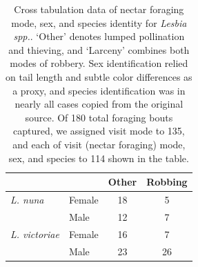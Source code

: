 \documentclass[fleqn,10pt,lineno]{wlpeerj}
\begin{document}
\begin{table}[ht]
\caption{\label{tab:widgets} Cross tabulation data of nectar foraging mode, sex, and species identity for \textit{Lesbia spp.}. `Other' denotes lumped pollination and thieving, and `Larceny' combines both modes of robbery. Sex identification relied on tail length and subtle color differences as a proxy, and species identification was in nearly all cases copied from the original source. Of 180 total foraging bouts captured, we assigned visit mode to 135, and each of visit (nectar foraging) mode, sex, and species to 114 shown in the table.}
\centering
\begin{tabular}{@{\vrule height 8pt depth 4pt width 0pt}llcc}
           			& 		& Other 	& Robbing \\ \hline
    {\em L. nuna} 	& Female 	& 18 	& 5 \\
    				& Male 	& 12 	& 7 \\ \hline
   {\em L. victoriae} 	& Female 	& 16 	& 7 \\
    				& Male 	& 23	& 26 \\ \hline
\end{tabular}
\end{table}
\clearpage



\end{document}
